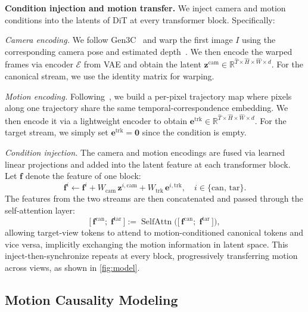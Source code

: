 \noindent\textbf{Condition injection and motion transfer.}\quad
We inject camera and motion conditions into the latents of DiT at every transformer block. Specifically:

\emph{Camera encoding.} We follow Gen3C~\cite{zhang2023scenewiz3d} and warp the first image $I$  using the corresponding camera pose and estimated depth~\cite{lin2025depth}. We then encode the warped frames via encoder $\mathcal{E}$ from VAE and obtain the latent $\mathbf{z}^{\text{cam}} \in \mathbb{R}^{\hat{T}\times \hat{H}\times\hat{W} \times d}$. For the canonical stream, we use the identity matrix for warping.

\emph{Motion encoding.} Following~\cite{geng2024motionprompting}, we build a per-pixel
trajectory map where pixels along one trajectory share the same temporal-correspondence
embedding. We then encode it via a lightweight encoder to obtain
$\mathbf{e}^{\text{trk}} \in \mathbb{R}^{\hat{T} \times
\hat{H}\times \hat{W} \times d}$. For the target stream, we simply set
$\mathbf{e}^{\text{trk}} = \mathbf{0}$ since the condition is empty.

\emph{Condition injection.} The camera and motion encodings are fused via learned linear projections and added into the latent feature at each transformer block. Let $\mathbf{f}$ denote the feature of one block:
\begin{equation}
  \mathbf{f}^{i} \leftarrow
    \mathbf{f}^{i}
    + W_{\text{cam}}\,\mathbf{z}^{i, \text{cam}}
    + W_{\text{trk}}\,\mathbf{e}^{i, \text{trk}},
  \quad i \in \{\text{can},\, \text{tar}\}.
  \label{eq:cond_inject}
\end{equation}
The features from the two streams are then concatenated  and passed through the self-attention layer:
\begin{equation}
  \bigl[\,\mathbf{f}^{\text{can}};\;
    \mathbf{f}^{\text{tar}}\,\bigr]
  := \operatorname{SelfAttn}\!\bigl(
    \bigl[\,\mathbf{f}^{\text{can}};\;
      \mathbf{f}^{\text{tar}}\,\bigr]\bigr),
  \label{eq:motion_sync}
\end{equation}
allowing target-view tokens to attend to motion-conditioned canonical tokens and vice versa, implicitly exchanging the motion information in latent space. This inject-then-synchronize repeats at every block, progressively transferring motion across views, as shown in \cref{fig:model}.

\subsection{Motion Causality Modeling}
\label{sec:interaction}

